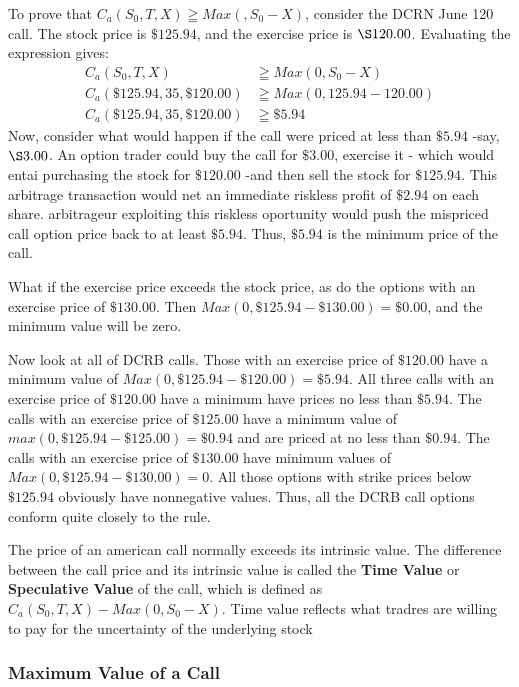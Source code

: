 \documentclass{book}
\theoremstyle{definition}
\theoremstyle{remark}
\begin{document}
            To prove that $C_a(S_0, T, X) \geqq Max(, S_0 - X)$, consider the DCRN June 120 call. The stock price is $\$125.94$, and the exercise price is $\S120.00$. Evaluating the expression gives:
                \begin{align*}
                    C_a(S_0, T, X) & \geqq Max(0, S_0 - X) \\ 
                    C_a(\$125.94, 35, \$120.00) & \geqq Max(0, 125.94-120.00) \\
                    C_a(\$125.94, 35, \$120.00) & \geqq \$5.94
                \end{align*}
            Now, consider what would happen if the call were priced at less than $\$5.94$ -say, $\S3.00$. An option trader could buy the call for $\$3.00$, exercise it - which would entai purchasing the stock for $\$120.00$ -and then sell the stock for $\$125.94$. This arbitrage transaction would net an immediate riskless profit of $\$2.94$ on each share. arbitrageur exploiting this riskless oportunity would push the mispriced call option price back to at least $\$5.94$. Thus, $\$5.94$ is the minimum price of the call. 
            
            What if the exercise price exceeds the stock price, as do the options with an exercise price of $\$130.00$. Then $Max(0, \$125.94 - \$130.00) = \$0.00$, and the minimum value will be zero. 
            
            Now look at all of DCRB calls. Those with an exercise price of $\$120.00$ have a minimum value of $Max(0, \$125.94 - \$120.00) = \$5.94 $. All three calls with an exercise price of $\$120.00$ have a minimum have prices no less than $\$5.94$. The calls with an exercise price of $\$125.00$ have a minimum value of $max(0, \$125.94 -\$125.00) = \$0.94$ and are priced at no less than $\$0.94$. The calls with an exercise price of $\$130.00$ have minimum values of $Max(0, \$125.94 - \$130.00) = 0$. All those options with strike prices below $\$125.94$ obviously have nonnegative values. Thus, all the DCRB call options conform quite closely to the rule. 
            
            The price of an american call normally exceeds its intrinsic value. The difference between the call price and its intrinsic value is called the \textbf{Time Value} or \textbf{Speculative Value} of the call, which is defined as $C_a(S_0, T, X) - Max(0, S_0 -X)$. Time value reflects what tradres are willing to pay for the uncertainty of the underlying stock
        \subsubsection{Maximum Value of a Call}
\end{document}

